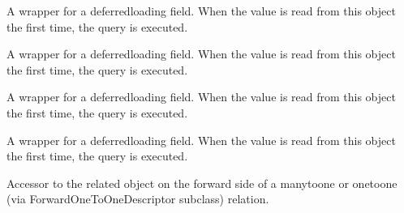 \documentclass[letterpaper,10pt,spanish]{sphinxmanual}
\begin{document}
\begin{fulllineitems}
\begin{fulllineitems}
\end{fulllineitems}



\begin{fulllineitems}

\pysigstartsignatures
{}
\pysigstopsignatures
\sphinxAtStartPar
A wrapper for a deferred\sphinxhyphen{}loading field. When the value is read from this
object the first time, the query is executed.

\end{fulllineitems}



\begin{fulllineitems}

\pysigstartsignatures
{}
\pysigstopsignatures
\sphinxAtStartPar
A wrapper for a deferred\sphinxhyphen{}loading field. When the value is read from this
object the first time, the query is executed.

\end{fulllineitems}



\begin{fulllineitems}

\pysigstartsignatures
{}
\pysigstopsignatures
\sphinxAtStartPar
A wrapper for a deferred\sphinxhyphen{}loading field. When the value is read from this
object the first time, the query is executed.

\end{fulllineitems}



\begin{fulllineitems}

\pysigstartsignatures
{}
\pysigstopsignatures
\sphinxAtStartPar
A wrapper for a deferred\sphinxhyphen{}loading field. When the value is read from this
object the first time, the query is executed.

\end{fulllineitems}



\begin{fulllineitems}

\pysigstartsignatures
{}
\pysigstopsignatures
\sphinxAtStartPar
Accessor to the related object on the forward side of a many\sphinxhyphen{}to\sphinxhyphen{}one or
one\sphinxhyphen{}to\sphinxhyphen{}one (via ForwardOneToOneDescriptor subclass) relation.


\end{fulllineitems}
\end{fulllineitems}
\end{document}
